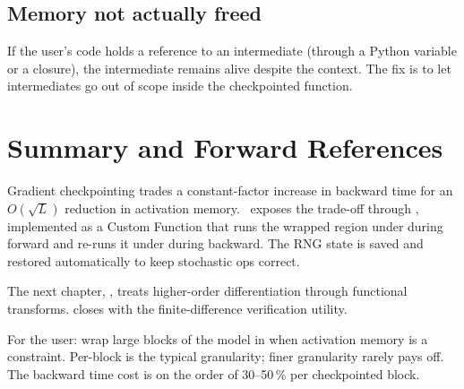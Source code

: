 \subsection{Memory not actually freed}
\label{ssec:gradient_checkpointing:not_freed}

If the user's code holds a reference to an intermediate
(through a Python variable or a closure), the intermediate
remains alive despite the  context. The fix is to
let intermediates go out of scope inside the checkpointed
function.

\section{Summary and Forward References}
\label{sec:gradient_checkpointing:summary}

Gradient checkpointing trades a constant-factor increase in
backward time for an $O(\sqrt{L})$ reduction in activation memory.
\Lucid\ exposes the trade-off through ,
implemented as a Custom Function that runs the wrapped region
under  during forward and re-runs it under
 during backward. The RNG state is saved and
restored automatically to keep stochastic ops correct.

The next chapter, , treats higher-order
differentiation through functional transforms.
 closes  with the
finite-difference verification utility.

\begin{lucidnote}
For the user: wrap large blocks of the model in
 when activation memory is a
constraint. Per-block is the typical granularity; finer
granularity rarely pays off. The backward time cost is on the
order of 30--50\,\% per checkpointed block.
\end{lucidnote}
